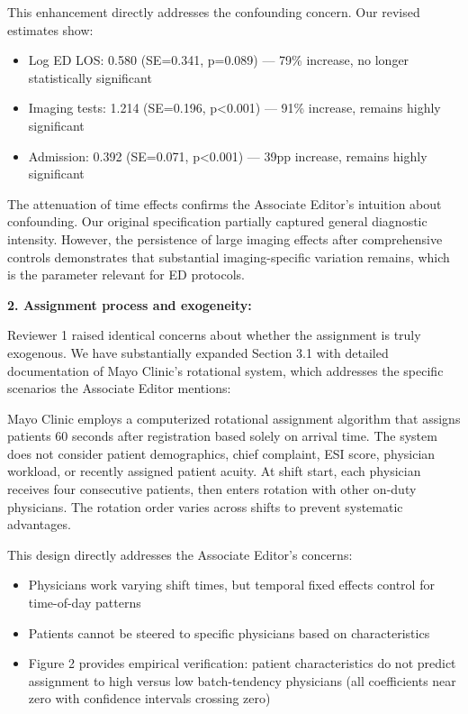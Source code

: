 \documentclass[11pt]{article}
\newcommand{\1}{\hbox{\rm 1\kern-.35em 1}}
\begin{document}
This enhancement directly addresses the confounding concern. Our revised estimates show:

\begin{itemize}
\item Log ED LOS: 0.580 (SE=0.341, p=0.089) — 79\% increase, no longer statistically significant
\item Imaging tests: 1.214 (SE=0.196, p<0.001) — 91\% increase, remains highly significant
\item Admission: 0.392 (SE=0.071, p<0.001) — 39pp increase, remains highly significant
\end{itemize}

The attenuation of time effects confirms the Associate Editor's intuition about confounding. Our original specification partially captured general diagnostic intensity. However, the persistence of large imaging effects after comprehensive controls demonstrates that substantial imaging-specific variation remains, which is the parameter relevant for ED protocols.

\textbf{2. Assignment process and exogeneity:}

Reviewer 1 raised identical concerns about whether the assignment is truly exogenous. We have substantially expanded Section 3.1 with detailed documentation of Mayo Clinic's rotational system, which addresses the specific scenarios the Associate Editor mentions:

Mayo Clinic employs a computerized rotational assignment algorithm that assigns patients 60 seconds after registration based solely on arrival time. The system does not consider patient demographics, chief complaint, ESI score, physician workload, or recently assigned patient acuity. At shift start, each physician receives four consecutive patients, then enters rotation with other on-duty physicians. The rotation order varies across shifts to prevent systematic advantages.

This design directly addresses the Associate Editor's concerns:

\begin{itemize}
\item Physicians work varying shift times, but temporal fixed effects control for time-of-day patterns
\item Patients cannot be steered to specific physicians based on characteristics
\item Figure 2 provides empirical verification: patient characteristics do not predict assignment to high versus low batch-tendency physicians (all coefficients near zero with confidence intervals crossing zero)
\end{itemize}
\end{document}
